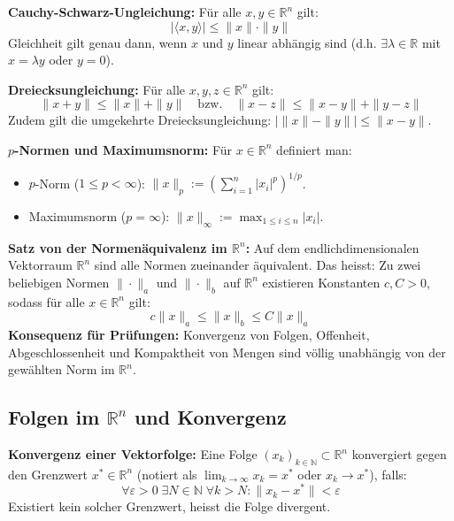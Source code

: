 \begin{theorem}
    \textbf{Cauchy-Schwarz-Ungleichung:} Für alle $x, y \in \mathbb{R}^n$ gilt:
    $$ |\langle x, y \rangle| \le \|x\| \cdot \|y\| $$
    Gleichheit gilt genau dann, wenn $x$ und $y$ linear abhängig sind (d.h. $\exists \lambda \in \mathbb{R}$ mit $x = \lambda y$ oder $y = 0$).
\end{theorem}

\begin{theorem}
    \textbf{Dreiecksungleichung:} Für alle $x, y, z \in \mathbb{R}^n$ gilt:
    $$ \|x + y\| \le \|x\| + \|y\| \quad \text{bzw.} \quad \|x - z\| \le \|x - y\| + \|y - z\| $$
    Zudem gilt die umgekehrte Dreiecksungleichung: $\big| \|x\| - \|y\| \big| \le \|x - y\|$.
\end{theorem}

\begin{definition}
    \textbf{$p$-Normen und Maximumsnorm:} Für $x \in \mathbb{R}^n$ definiert man:
    \begin{itemize}
        \item $p$-Norm ($1 \le p < \infty$): $\|x\|_p := \left( \sum_{i=1}^n |x_i|^p \right)^{1/p}$.
        \item Maximumsnorm ($p = \infty$): $\|x\|_\infty := \max_{1 \le i \le n} |x_i|$.
    \end{itemize}
\end{definition}

\begin{theorem}
    \textbf{Satz von der Normenäquivalenz im $\mathbb{R}^n$:} Auf dem endlichdimensionalen Vektorraum $\mathbb{R}^n$ sind alle Normen zueinander äquivalent. Das heisst: Zu zwei beliebigen Normen $\|\cdot\|_a$ und $\|\cdot\|_b$ auf $\mathbb{R}^n$ existieren Konstanten $c, C > 0$, sodass für alle $x \in \mathbb{R}^n$ gilt:
    $$ c \|x\|_a \le \|x\|_b \le C \|x\|_a $$
    \textbf{Konsequenz für Prüfungen:} Konvergenz von Folgen, Offenheit, Abgeschlossenheit und Kompaktheit von Mengen sind völlig unabhängig von der gewählten Norm im $\mathbb{R}^n$.
\end{theorem}

\subsection{Folgen im $\mathbb{R}^n$ und Konvergenz}

\begin{definition}
    \textbf{Konvergenz einer Vektorfolge:} Eine Folge $(x_k)_{k \in \mathbb{N}} \subset \mathbb{R}^n$ konvergiert gegen den Grenzwert $x^* \in \mathbb{R}^n$ (notiert als $\lim_{k \to \infty} x_k = x^*$ oder $x_k \to x^*$), falls:
    $$ \forall \varepsilon > 0 \; \exists N \in \mathbb{N} \; \forall k > N: \|x_k - x^*\| < \varepsilon $$
    Existiert kein solcher Grenzwert, heisst die Folge divergent.
\end{definition}

